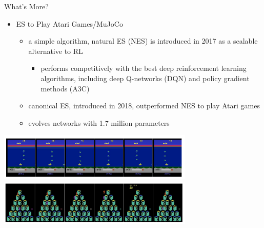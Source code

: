 \begin{frame}{What's More?}
\begin{itemize}
    \item ES to Play Atari Games/MuJoCo
    \begin{itemize}
        \item a simple algorithm, natural ES (NES) is introduced in 2017 as a scalable alternative to RL
        \begin{itemize}
            \item performs competitively with the best deep reinforcement learning algorithms, including deep Q-networks (DQN) and policy gradient methods (A3C)
        \end{itemize}
        \item canonical ES, introduced in 2018, outperformed NES to play Atari games
        \item evolves networks with 1.7 million parameters
    \end{itemize}
\end{itemize}
\centering
\includegraphics[width=0.7\textwidth]{new_images/ESA.png}\\
\includegraphics[width=0.7\textwidth]{new_images/ESA2.png}
\end{frame}


